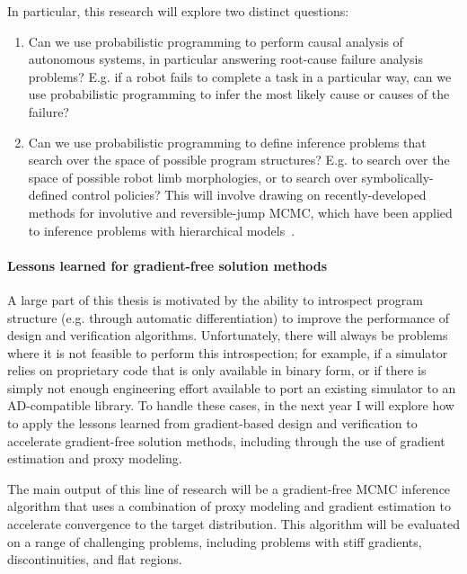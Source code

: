 In particular, this research will explore two distinct questions:
\begin{enumerate}
    \item Can we use probabilistic programming to perform causal analysis of autonomous systems, in particular answering root-cause failure analysis problems? E.g. if a robot fails to complete a task in a particular way, can we use probabilistic programming to infer the most likely cause or causes of the failure?
    \item Can we use probabilistic programming to define inference problems that search over the space of possible program structures? E.g. to search over the space of possible robot limb morphologies, or to search over symbolically-defined control policies? This will involve drawing on recently-developed methods for involutive and reversible-jump MCMC, which have been applied to inference problems with hierarchical models~\cite{cusumano-townerAutomatingInvolutiveMCMC2020}.
\end{enumerate}




\paragraph{Lessons learned for gradient-free solution methods}

A large part of this thesis is motivated by the ability to introspect program structure (e.g. through automatic differentiation) to improve the performance of design and verification algorithms. Unfortunately, there will always be problems where it is not feasible to perform this introspection; for example, if a simulator relies on proprietary code that is only available in binary form, or if there is simply not enough engineering effort available to port an existing simulator to an AD-compatible library. To handle these cases, in the next year I will explore how to apply the lessons learned from gradient-based design and verification to accelerate gradient-free solution methods, including through the use of gradient estimation and proxy modeling.

The main output of this line of research will be a gradient-free MCMC inference algorithm that uses a combination of proxy modeling and gradient estimation to accelerate convergence to the target distribution. This algorithm will be evaluated on a range of challenging problems, including problems with stiff gradients, discontinuities, and flat regions.

